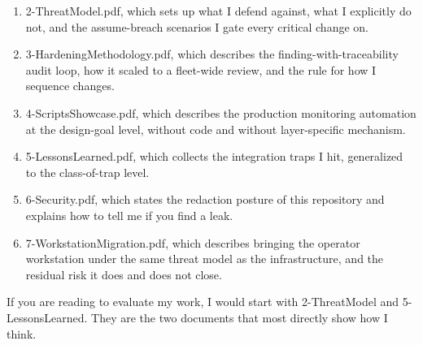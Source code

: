 \documentclass[12pt]{article}
\begin{document}
\begin{enumerate}[leftmargin=18pt,itemsep=2pt]
  \item 2-ThreatModel.pdf, which sets up what I defend against, what I explicitly do not, and the assume-breach scenarios I gate every critical change on.
  \item 3-HardeningMethodology.pdf, which describes the finding-with-traceability audit loop, how it scaled to a fleet-wide review, and the rule for how I sequence changes.
  \item 4-ScriptsShowcase.pdf, which describes the production monitoring automation at the design-goal level, without code and without layer-specific mechanism.
  \item 5-LessonsLearned.pdf, which collects the integration traps I hit, generalized to the class-of-trap level.
  \item 6-Security.pdf, which states the redaction posture of this repository and explains how to tell me if you find a leak.
  \item 7-WorkstationMigration.pdf, which describes bringing the operator workstation under the same threat model as the infrastructure, and the residual risk it does and does not close.
\end{enumerate}

If you are reading to evaluate my work, I would start with 2-ThreatModel and 5-LessonsLearned. They are the two documents that most directly show how I think.
\end{document}
